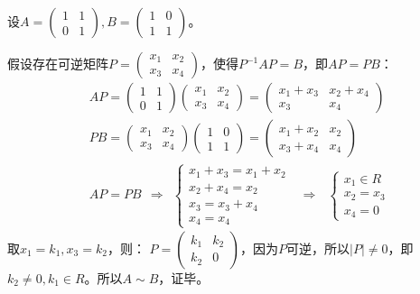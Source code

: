 \documentclass[a4paper]{report}
\begin{document}
\begin{zhengming}
设$A=\begin{pmatrix}
1&1\\0&1
\end{pmatrix},B=\begin{pmatrix}
1&0\\1&1
\end{pmatrix}$。

假设存在可逆矩阵$P=
\begin{pmatrix}
x_1&x_2\\
x_3&x_4
\end{pmatrix}
$，使得$P^{-1}AP=B$，即$AP=PB$：
\begin{align*}
&AP=\begin{pmatrix}
1&1\\0&1
\end{pmatrix}\begin{pmatrix}
x_1&x_2\\
x_3&x_4
\end{pmatrix}=\begin{pmatrix}
x_1+x_3&x_2+x_4\\
x_3&x_4
\end{pmatrix}\\
&PB=\begin{pmatrix}
x_1&x_2\\
x_3&x_4
\end{pmatrix}\begin{pmatrix}
1&0\\1&1
\end{pmatrix}=
\begin{pmatrix}
x_1+x_2&x_2\\
x_3+x_4&x_4
\end{pmatrix}\\
&AP=PB~~\Rightarrow~~
\begin{cases}
x_1+x_3=x_1+x_2\\
x_2+x_4=x_2\\
x_3=x_3+x_4\\
x_4=x_4
\end{cases}~~~\Rightarrow~~~
\begin{cases}
x_1\in R\\
x_2=x_3\\
x_4=0
\end{cases}
\end{align*}
取$x_1=k_1,x_3=k_2$，则：
$
P=
\begin{pmatrix}
k_1&k_2\\
k_2&0
\end{pmatrix}
$，因为$P$可逆，所以$|P|\neq 0$，即$k_2\neq0,k_1\in R$。所以$A\sim B$，证毕。
\end{zhengming}
\end{document}
